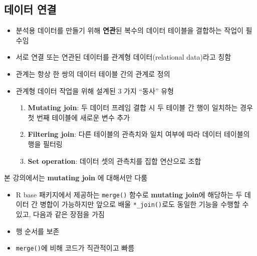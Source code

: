 \documentclass[
  11pt,
]{krantz}
\makeatletter
\providecommand{\tightlist}{%
  \setlength{\itemsep}{0pt}\setlength{\parskip}{0pt}}
\newenvironment{kframe}{%
\medskip{}
\setlength{\fboxsep}{.8em}
 \def\at@end@of@kframe{}%
 \ifinner\ifhmode%
  \def\at@end@of@kframe{\end{minipage}}%
  \begin{minipage}{\columnwidth}%
 \fi\fi%
 \def\FrameCommand##1{\hskip\@totalleftmargin \hskip-\fboxsep
 \colorbox{shadecolor}{##1}\hskip-\fboxsep
     \hskip-\linewidth \hskip-\@totalleftmargin \hskip\columnwidth}%
 \MakeFramed {\advance\hsize-\width
   \@totalleftmargin\z@ \linewidth\hsize
   \@setminipage}}%
 {\par\unskip\endMakeFramed%
 \at@end@of@kframe}
\renewenvironment{quote}{\begin{kframe}}{\end{kframe}}
\let\BeginKnitrBlock\begin \let\EndKnitrBlock\end
\makeatother
\begin{document}
\normalsize

\hypertarget{dplyr-join}{%
\subsection{데이터 연결}\label{dplyr-join}}

\begin{itemize}
\item
  분석용 데이터를 만들기 위해 \textbf{연관}된 복수의 데이터 테이블을 결합하는 작업이 필수임
\item
  서로 연결 또는 연관된 데이터를 관계형 데이터(relational data)라고 칭함
\item
  관계는 항상 한 쌍의 데이터 테이블 간의 관계로 정의
\item
  관계형 데이터 작업을 위해 설계된 3 가지 ``동사'' 유형

  \begin{enumerate}
  \def\labelenumi{\alph{enumi}.}
  \tightlist
  \item
    \textbf{Mutating join}: 두 데이터 프레임 결합 시 두 테이블 간 행이 일치하는 경우 첫 번째 테이블에 새로운 변수 추가
  \item
    \textbf{Filtering join}: 다른 테이블의 관측치와 일치 여부에 따라 데이터 테이블의 행을 필터링
  \item
    \textbf{Set operation}: 데이터 셋의 관측치를 집합 연산으로 조합
  \end{enumerate}
\end{itemize}

\footnotesize

\BeginKnitrBlock{rmdnote}
본 강의에서는 \textbf{mutating join} 에 대해서만 다룸
\EndKnitrBlock{rmdnote}

\normalsize

\begin{itemize}
\tightlist
\item
  R base 패키지에서 제공하는 \texttt{merge()} 함수로 \textbf{mutating join}에 해당하는 두 데이터 간 병합이 가능하지만 앞으로 배울 \texttt{*\_join()}로도 동일한 기능을 수행할 수 있고, 다음과 같은 장점을 가짐
\end{itemize}

\begin{quote}
\begin{itemize}
\tightlist
\item
  행 순서를 보존
\item
  \texttt{merge()}에 비해 코드가 직관적이고 빠름
\end{itemize}
\end{quote}
\end{document}
